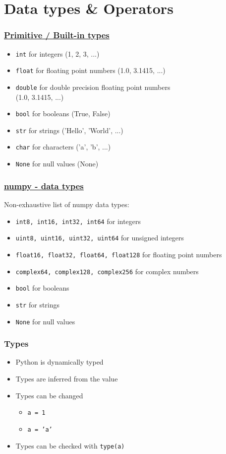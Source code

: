 \documentclass{beamer}
\newcommand{\hrefu}[2]{\underline{\href{#1}{#2}}}
\begin{document}
\section{Data types \& Operators}
\begin{frame}
    \frametitle{\hrefu{https://docs.python.org/3/library/stdtypes.html}{Primitive / Built-in types}}
    \begin{itemize}
      \item \texttt{int} for integers (1, 2, 3, ...)
      \item \texttt{float} for floating point numbers (1.0, 3.1415, ...)
      \item \texttt{double} for double precision floating point numbers \\
      (1.0, 3.1415, ...)
      \item \texttt{bool} for booleans (True, False)
      \item \texttt{str} for strings ('Hello', 'World', ...)
      \item \texttt{char} for characters ('a', 'b', ...)
      \item \texttt{None} for null values (None)
    \end{itemize}
\end{frame}
\begin{frame}
  \frametitle{\hrefu{https://numpy.org/doc/stable/user/basics.types.html}{numpy - data types}}
  Non-exhaustive list of numpy data types:
  \begin{itemize}
    \item \texttt{int8, int16, int32, int64} for integers
    \item \texttt{uint8, uint16, uint32, uint64} for unsigned integers
    \item \texttt{float16, float32, float64, float128} for floating point numbers
    \item \texttt{complex64, complex128, complex256} for complex numbers
    \item \texttt{bool} for booleans
    \item \texttt{str} for strings
    \item \texttt{None} for null values
  \end{itemize}
\end{frame}
\begin{frame}
    \frametitle{Types}
  \begin{itemize}
    \item Python is dynamically typed
    \item Types are inferred from the value
    \item Types can be changed
    \begin{itemize}
      \item \texttt{a = 1}
      \item \texttt{a = 'a'}
    \end{itemize}
    \item Types can be checked with \texttt{type(a)}
  \end{itemize}
\end{frame}
\end{document}
